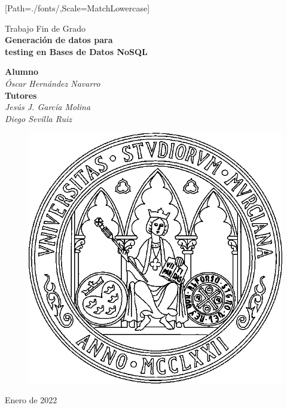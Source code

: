 \documentclass[spanish,11pt,twoside]{scrbook}
\begin{document}
\thispagestyle{empty}
\sloppy

\setmonofont{Inconsolata-Regular.ttf}[Path=./fonts/,Scale=MatchLowercase]

\begin{titlepage}
\thispagestyle{empty}
\vfill\vspace*{1cm}
\begin{center}
{\sc Trabajo Fin de Grado}\\
\vspace{.5cm}
{\huge\sf\bfseries Generación de datos para}\\[0.2cm]
{\huge\sf\bfseries testing en Bases de Datos NoSQL}\\[3.3cm]

\begin{large}
{\bf Alumno}\\
\emph{Óscar Hernández Navarro}\\[1cm]

{\bf Tutores}\\
\emph{Jesús J. García Molina}\\
\emph{Diego Sevilla Ruiz} \\
\end{large}
\vfill
\begin{figure}[h!]
\centerline{\includegraphics[width=.35\textwidth]{escudoum.png}}
\end{figure}
\vfill
Enero de 2022
\end{center}
\end{titlepage}
\restoregeometry


\cleardoublepage



\cleardoublepage

\tableofcontents
\cleardoublepage
\end{document}
